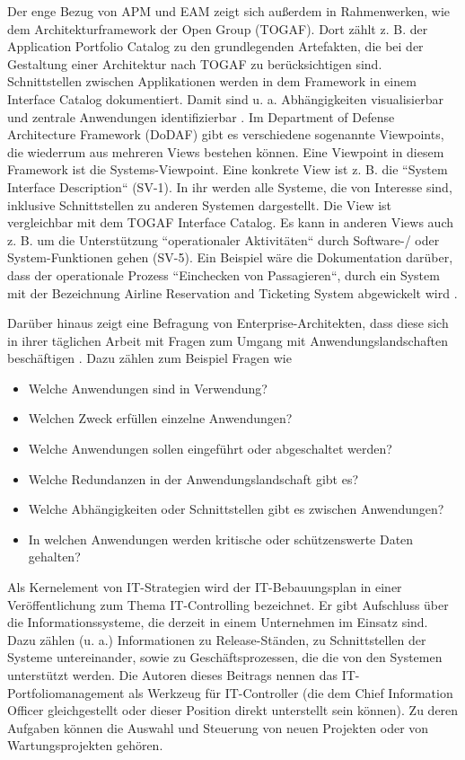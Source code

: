 Der enge Bezug von APM und EAM zeigt sich außerdem in Rahmenwerken, wie dem Architekturframework der Open Group (TOGAF). Dort zählt z. B. der Application Portfolio Catalog zu den grundlegenden Artefakten, die bei der Gestaltung einer Architektur nach TOGAF zu berücksichtigen sind. Schnittstellen zwischen Applikationen werden in dem Framework in einem Interface Catalog dokumentiert. Damit sind u. a. Abhängigkeiten visualisierbar und zentrale Anwendungen identifizierbar \cite[Kap. 31]{togaf}. Im Department of Defense Architecture Framework (DoDAF) gibt es verschiedene sogenannte Viewpoints, die wiederrum aus mehreren Views bestehen können. Eine Viewpoint in diesem Framework ist die Systems-Viewpoint. Eine konkrete View ist z. B. die ``System Interface Description`` (SV-1). In ihr werden alle Systeme, die von Interesse sind, inklusive Schnittstellen zu anderen Systemen dargestellt. Die View ist vergleichbar mit dem TOGAF Interface Catalog. Es kann in anderen Views auch z. B. um die Unterstützung ``operationaler Aktivitäten`` durch Software-/ oder System-Funktionen gehen (SV-5). Ein Beispiel wäre die Dokumentation darüber, dass der operationale Prozess ``Einchecken von Passagieren``, durch ein System mit der Bezeichnung Airline Reservation and Ticketing System abgewickelt wird \cite[S. 311-344]{Rao}.

Darüber hinaus zeigt eine Befragung von Enterprise-Architekten, dass diese sich in ihrer täglichen Arbeit mit Fragen zum Umgang mit Anwendungslandschaften beschäftigen \cite{jung2}. Dazu zählen zum Beispiel Fragen wie 

\begin{itemize}
  \item Welche Anwendungen sind in Verwendung? 
  \item Welchen Zweck erfüllen einzelne Anwendungen?
  \item Welche Anwendungen sollen eingeführt oder abgeschaltet werden?
  \item Welche Redundanzen in der Anwendungslandschaft gibt es?
  \item Welche Abhängigkeiten oder Schnittstellen gibt es zwischen Anwendungen?
  \item In welchen Anwendungen werden kritische oder schützenswerte Daten gehalten?
\end{itemize}

Als Kernelement von IT-Strategien wird der IT-Bebauungsplan in einer Veröffentlichung zum Thema IT-Controlling bezeichnet. Er gibt Aufschluss über die Informationssysteme, die derzeit in einem Unternehmen im Einsatz sind. Dazu zählen (u. a.) Informationen zu Release-Ständen, zu Schnittstellen der Systeme untereinander, sowie zu Geschäftsprozessen, die die von den Systemen unterstützt werden. \cite[S. 36]{gadatsch} Die Autoren dieses Beitrags nennen das IT-Portfoliomanagement als Werkzeug für IT-Controller (die dem Chief Information Officer gleichgestellt oder dieser Position direkt unterstellt sein können). Zu deren Aufgaben können die Auswahl und Steuerung von neuen Projekten oder von Wartungsprojekten gehören. \cite[S. 41-45]{gadatsch}

